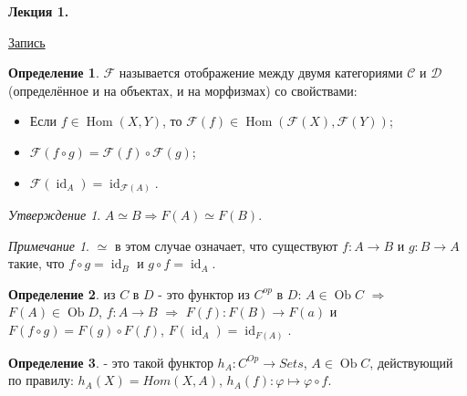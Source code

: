 \documentclass[a4paper]{article}
\newcommand{\mybox}{%
    \collectbox{%
        \setlength{\fboxsep}{1pt}%
        \fbox{\BOXCONTENT}%
    }%
}
\theoremstyle{indented}
\theoremstyle{definition}
\newtheorem{defn}{Определение}
\theoremstyle{remark}
\newtheorem{remark}{Примечание}
\newtheorem{stat}{Утверждение}
\DeclareMathOperator{\ra}{\rightarrow}
\DeclareMathOperator{\Ra}{\Rightarrow}
\DeclareMathOperator{\id}{id}
\DeclareMathOperator{\Hom}{Hom}
\DeclareMathOperator{\Ob}{Ob}
\begin{document}
\textbf{Лекция 1.} 

\begin{flushright}
    \mybox{
        \href{https://disk.yandex.ru/d/knoQ44wLmGDwwQ/2021-2022%20учебный%20год%20(осенний%20семестр)/2%20курс/Теоретическая%20информатика/Теор%20информатика%2C%20лекция%2C%2001.09.2021.mp4}{Запись}
    }
\end{flushright}

\begin{defn}
     $\mathcal{F}$ называется отображение между двумя категориями $\mathcal{C}$ и $\mathcal{D}$ (определённое и на объектах, и на морфизмах) со свойствами: 

        \begin{itemize}
            \item Если $f\in \Hom (X, Y)$, то $\mathcal{F} (f)\in \Hom (\mathcal{F}(X), \mathcal{F}(Y))$;
            \item $\mathcal{F}(f\circ  g) = \mathcal{F}(f) \circ  \mathcal{F}(g)$;
            \item $\mathcal{F}(\id_{A}) = \id_{\mathcal{F}(A)}$.
        \end{itemize}
\end{defn} 

\begin{stat} 
    $A \simeq B \Ra F(A) \simeq F(B)$.
\end{stat}

\begin{remark}
    $\simeq$ в этом случае означает, что существуют $f: A \ra B$ и $g: B \ra A$ такие, что $f \circ g = \id_B$ и $g \circ f = \id_A$. 
\end{remark}

\begin{defn}
     из $C$ в $D$ - это функтор из $C^{op}$ в $D$: $A \in\Ob C$ $\Ra$ $F(A) \in\Ob D$, $f: A \ra B$ $\Ra$ $F(f): F(B) \ra F(a)$ и $F(f \circ g) = F(g) \circ F(f)$, $F(\id_A) = \id_{F(A)}$.
\end{defn}

\begin{defn} 
     - это такой функтор $h_A: C^{Op} \ra Sets$, $A \in\Ob C$, действующий по правилу: $h_A(X) = Hom(X, A)$, $h_A(f): \varphi \mapsto \varphi \circ f$.
\end{defn}
\end{document}
